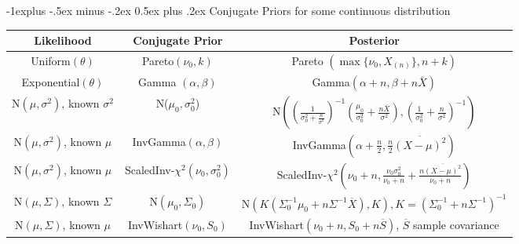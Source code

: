 \documentclass[10pt,landscape]{article}
\makeatletter
\renewcommand{\subsection}{\@startsection{subsection}{2}{0mm}%
                                {-1explus -.5ex minus -.2ex}%
                                {0.5ex plus .2ex}%
                                {\normalfont\normalsize\bfseries}}
\makeatother
\begin{document}
\subsection{Conjugate Priors for some continuous distribution}
\begin{center}
    \renewcommand{\arraystretch}{3.7}
\begin{tabular}{ccc}
    \textbf{Likelihood} & \textbf{Conjugate Prior} & \textbf{Posterior} \\\hline

    Uniform$(\theta)$ & Pareto$(\nu_0,k)$ & Pareto $\left(\max\{\nu_0,X_{(n)}\}, n+k \right)$\\\hline

    Exponential$(\theta)$ & Gamma $(\alpha,\beta)$ & Gamma$(\alpha+n,\beta+n\bar{X})$\\\hline

    N$(\mu,\sigma^2)$, known $\sigma^2$ & N($\mu_0,\sigma_0^2$) & N$\left(\left( \frac{1}{\sigma_0^2+\frac{n}{\sigma^2}}\right)^{-1} \left( \frac{\mu_0}{\sigma_0^2} + \frac{n\bar{X}}{\sigma^2}\right), \left(\frac{1}{\sigma_0^2} + \frac{n}{\sigma^2}\right)^{-1}\right)$ \\\hline

    N$(\mu,\sigma^2)$, known $\mu$ & InvGamma$(\alpha,\beta)$ & InvGamma$\left(\alpha+\frac{n}{2}, \frac{n}{2} \overline{(X-\mu)^2}\right)$ \\\hline

    N$(\mu,\sigma^2)$, known $\mu$ & ScaledInv-$\chi^2(\nu_0,\sigma_0^2)$ & ScaledInv-$\chi^2 \left(\nu_0+n, \frac{\nu_0\sigma_0^2}{\nu_0+n} + \frac{n\overline{(X-\mu)^2}}{\nu_0+n}\right)$ \\\hline
    
    N$(\mu,\Sigma)$, known $\Sigma$ & N$(\mu_0,\Sigma_0)$ & N$\left(K (\Sigma_0^{-1}\mu_0+n\Sigma^{-1}\overline{X}), K\right), K=(\Sigma_0^{-1}+n\Sigma^{-1})^{-1}$ \\\hline

     N$(\mu,\Sigma)$, known $\mu$ & InvWishart$(\nu_0,S_0)$ & InvWishart$(\nu_0 +n, S_0+n\overline{S})$, $\overline{S}$ sample covariance \\\hline\hline
    

\end{tabular}
\end{center}
\end{document}
